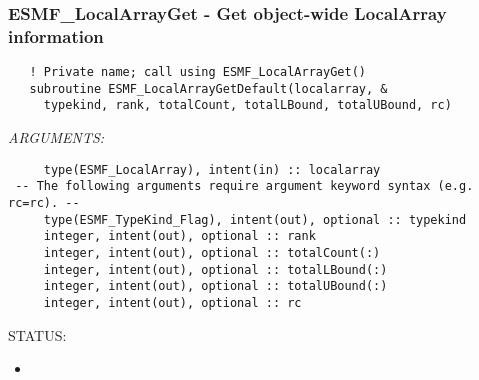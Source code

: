  
\setlength{\oldparskip}{\parskip}
\setlength{\parskip}{1.5ex}
\setlength{\oldparindent}{\parindent}
\setlength{\parindent}{0pt}
\setlength{\oldbaselineskip}{\baselineskip}
\setlength{\baselineskip}{11pt}
 
\def\bv{\begin{verbatim}}
\def\ev{\end{verbatim}}
\def\be{\begin{equation}}
\def\ee{\end{equation}}
\def\bea{\begin{eqnarray}}
\def\eea{\end{eqnarray}}
\def\bi{\begin{itemize}}
\def\ei{\end{itemize}}
\def\bn{\begin{enumerate}}
\def\en{\end{enumerate}}
\def\bd{\begin{description}}
\def\ed{\end{description}}
\def\({\left (}
\def\){\right )}
\def\[{\left [}
\def\]{\right ]}
\def\<{\left  \langle}
\def\>{\right \rangle}
\def\cI{{\cal I}}
\def\diag{\mathop{\rm diag}}
\def\tr{\mathop{\rm tr}}


 
\subsubsection [ESMF\_LocalArrayGet] {ESMF\_LocalArrayGet - Get object-wide LocalArray information}


  
\begin{verbatim}   ! Private name; call using ESMF_LocalArrayGet()
   subroutine ESMF_LocalArrayGetDefault(localarray, &
     typekind, rank, totalCount, totalLBound, totalUBound, rc)\end{verbatim}{\em ARGUMENTS:}
\begin{verbatim}     type(ESMF_LocalArray), intent(in) :: localarray
 -- The following arguments require argument keyword syntax (e.g. rc=rc). --
     type(ESMF_TypeKind_Flag), intent(out), optional :: typekind
     integer, intent(out), optional :: rank
     integer, intent(out), optional :: totalCount(:)
     integer, intent(out), optional :: totalLBound(:)
     integer, intent(out), optional :: totalUBound(:)
     integer, intent(out), optional :: rc\end{verbatim}
{\sf STATUS:}
   \begin{itemize}
   \item{}
   \end{itemize}
  
